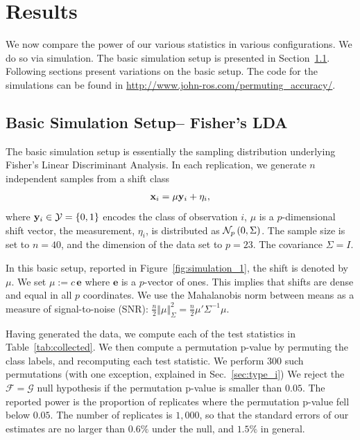 \documentclass[oupdraft]{bio}
\begin{document}
\section{Results}
\label{sec:results}
We now compare the power of our various statistics in various configurations. 
We do so via simulation.
The basic simulation setup is presented in Section~\ref{sec:simulation_details}.
Following sections present variations on the basic setup.
The \R code for the simulations can be found in \url{http://www.john-ros.com/permuting_accuracy/}.


\subsection{Basic Simulation Setup-- Fisher's LDA}
\label{sec:simulation_details}

The basic simulation setup is essentially the sampling distribution underlying Fisher's Linear Discriminant Analysis. 
In each replication, we generate $n$ independent samples from a shift class 
\begin{align}
\label{eq:distribution}
\mathbf{x}_i = \mu \mathbf{y}_i + \eta_i,
\end{align}
where $\mathbf{y}_i \in \mathcal{Y}=\{ 0,1 \}$ encodes the class of observation $i$, $\mu$ is a $p$-dimensional shift vector, the measurement, $\eta_i$, is distributed as $\mathcal{N}_{p}\left(0,\Sigma\right)$.
The sample size is set to $n=40$, and the dimension of the data set to $p=23$. 
The covariance $\Sigma=I$. 

In this basic setup, reported in Figure~\ref{fig:simulation_1}, the shift is denoted by $\mu$. 
We set $\mu:=c \, \textbf{e}$ where $\textbf{e}$ is a $p$-vector of ones. 
This implies that shifts are dense and equal in all $p$ coordinates.
We use the Mahalanobis norm between means as a measure of signal-to-noise (SNR): 
$\frac{n}{2}\Vert \mu \Vert_\Sigma^2=\frac{n}{2} \mu' \Sigma^{-1} \mu$.

Having generated the data, we compute each of the test statistics in Table~\ref{tab:collected}.
We then compute a permutation p-value by permuting the class labels, and recomputing each test statistic. 
We perform $300$ such permutations (with one exception, explained in Sec.~\ref{sec:type_i})
We reject the $\mathcal{F}=\mathcal{G}$ null hypothesis if the permutation p-value is smaller than $0.05$.
The reported power is the proportion of replicates where the permutation p-value fell below $0.05$.
The number of replicates is $1,000$, so that the standard errors of our estimates are no larger than $0.6\%$ under the null, and $1.5\%$ in general. 
\end{document}
